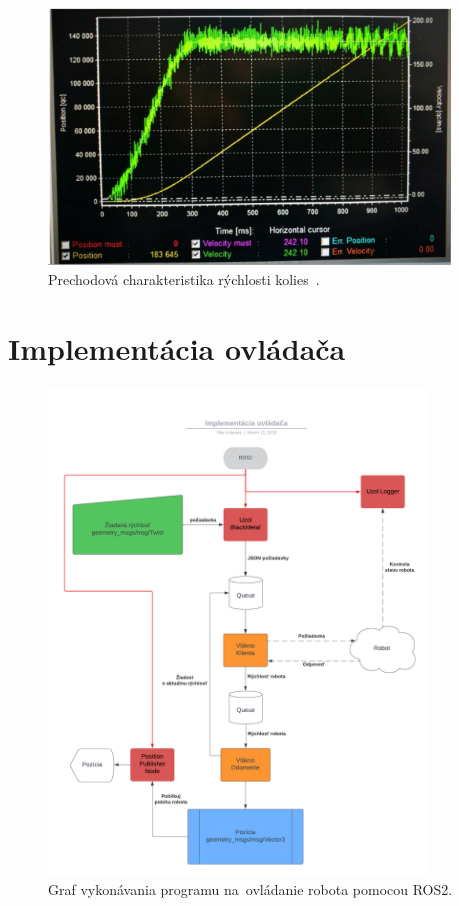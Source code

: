 \begin{figure}[!htbp]
	\begin{center}
		\includegraphics[width=0.95\textwidth]{img/robotSpeedChar.png}
	\end{center}
	\caption{Prechodová charakteristika rýchlosti kolies~\cite{timovyProjekt}. }
	\label{fig:prechChar}
\end{figure}

\section{Implementácia ovládača}
\label{sec:program}

\begin{figure}[!htbp]
	\begin{center}
		\includegraphics[width=0.9\textwidth]{img/BlackMetal_flowchart.png}
	\end{center}
	\caption{Graf vykonávania programu na~ovládanie robota pomocou ROS2.}
	\label{fig:flowchart}
\end{figure}

